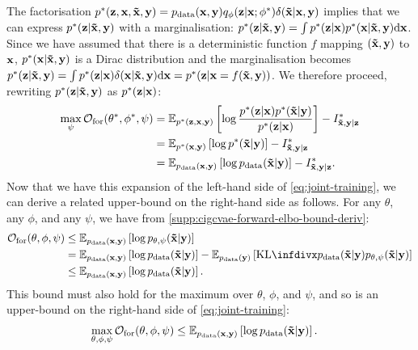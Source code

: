 The factorisation ${p}^*({\mathbf{z}}, {\mathbf{x}}, \mathbf{\tilde{x}}{}, {\mathbf{y}}) = p_{\rm{data}} ({\mathbf{x}},
{\mathbf{y}}) q_\phi({\mathbf{z}}|{\mathbf{x}}; {\phi}^*)\delta(\mathbf{\tilde{x}}{}|{\mathbf{x}},{\mathbf{y}})$ implies that
we can express ${p}^*{}({\mathbf{z}}|\mathbf{\tilde{x}}{},{\mathbf{y}})$ with a marginalisation:
${p}^*{}({\mathbf{z}}|\mathbf{\tilde{x}}{},{\mathbf{y}})=\int {p}^*{}({\mathbf{z}}|{\mathbf{x}})
{p}^*{}({\mathbf{x}}|\mathbf{\tilde{x}}{},{\mathbf{y}}) \mathrm{d}{\mathbf{x}}$. Since we have assumed that
there is a deterministic function $f$ mapping $(\mathbf{\tilde{x}}{},{\mathbf{y}})$ to ${\mathbf{x}}$,
${p}^*{}({\mathbf{x}}|\mathbf{\tilde{x}}{},{\mathbf{y}})$ is a Dirac distribution and the
marginalisation becomes ${p}^*{}({\mathbf{z}}|\mathbf{\tilde{x}}{},{\mathbf{y}}) = \int {p}^*{}({\mathbf{z}}|{\mathbf{x}})
\delta({\mathbf{x}}|\mathbf{\tilde{x}}{},{\mathbf{y}}) \mathrm{d}{\mathbf{x}} =
{p}^*{}({\mathbf{z}}|{\mathbf{x}}=f(\mathbf{\tilde{x}}{},{\mathbf{y}}))$. We therefore proceed, rewriting
${p}^*{}({\mathbf{z}}|\mathbf{\tilde{x}}{},{\mathbf{y}})$ as ${p}^*{}({\mathbf{z}}|{\mathbf{x}})$:
\begin{align}
  \max_{\psi } \mathcal{O}_\mathrm{for}({\theta}^*, {\phi}^*, \psi ) &= \mathbb{E}_{{p}^*{}({\mathbf{z}},{\mathbf{x}},{\mathbf{y}})} \left[ \log \frac{{p}^*{}({\mathbf{z}}|{\mathbf{x}}){p}^*{}(\mathbf{\tilde{x}}{}|{\mathbf{y}})}{{p}^*({\mathbf{z}}|{\mathbf{x}})} \right] - I^*_{\mathbf{\tilde{x}}{},\mathbf{y}{}|\mathbf{z}{}}{} \label{eq:post-mapping}\\
                                                                                           &= \mathbb{E}_{{p}^*{}({\mathbf{x}},{\mathbf{y}})} \left[ \log {p}^*{} (\mathbf{\tilde{x}}{}|{\mathbf{y}}) \right] - I^*_{\mathbf{\tilde{x}}{},\mathbf{y}{}|\mathbf{z}{}}{}\\
                                                                                           &= \mathbb{E}_{p_{\rm{data}} ({\mathbf{x}},{\mathbf{y}})} \left[ \log p_{\rm{data}}  (\mathbf{\tilde{x}}{}|{\mathbf{y}}) \right] - I^*_{\mathbf{\tilde{x}}{},\mathbf{y}{}|\mathbf{z}{}}{}. \label{eq:max-partphi-bound}
\end{align}
Now that we have this expansion of the left-hand side of
\cref{eq:joint-training}, we can derive a related upper-bound on the right-hand
side as follows. For any $\theta$, any $\phi$, and any $\psi$, we have
from \cref{supp:cigcvae-forward-elbo-bound-deriv}:
\begin{align}
  \mathcal{O}_\mathrm{for}(\theta, \phi, \psi ) &\leq \EX_{\pdata (\rvx,\rvy)} \left[ \log p_{\theta,\psi}(\tildeI{}|\rvy) \right] \\
                                                     &= \EX_{\pdata (\rvx,\rvy)} \left[ \log \pdata (\tildeI{}|\rvy) \right] - \EX_{\pdata (\rvy)}\left[ \kl{\pdata (\tildeI{}|\rvy)}{p_{\theta,\psi}(\tildeI{}|\rvy)} \right] \\
                                                     &\leq \EX_{\pdata (\rvx,\rvy)} \left[ \log \pdata (\tildeI{}|\rvy) \right].
\end{align}
This bound must also hold for the maximum over $\theta$, $\phi$, and
$\psi$, and so is an upper-bound on the right-hand side of \cref{eq:joint-training}:
\begin{align}
  \max_{\theta, \phi, \psi } \mathcal{O}_\mathrm{for}(\theta, \phi, \psi ) &\leq \mathbb{E}_{p_{\rm{data}} ({\mathbf{x}},{\mathbf{y}})} \left[ \log p_{\rm{data}} (\mathbf{\tilde{x}}{}|{\mathbf{y}}) \right]. \label{eq:max-all-bound}
\end{align}

